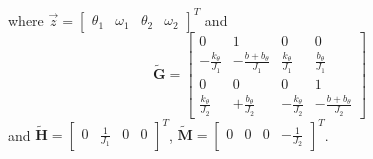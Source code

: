 \documentclass[11pt,a4paper,oneside]{book}
\numberwithin{equation}{section}
\theoremstyle{it}
\theoremstyle{definition}
\begin{document}
where $\vec{z}=\left[ \begin{matrix}
	\theta_1&\omega_1&\theta_2&\omega_2
\end{matrix}\right]^T$
and 
\begin{equation}
	\tilde{\mathbf{G}} = 
	\left[ \begin{matrix}
		0&1&0&0\\[6pt]
		-\frac{k_{\theta}}{J_1}&-\frac{b+b_{\theta}}{J_1}&\frac{k_{\theta}}{J_1}&\frac{b_{\theta}}{J_1}\\[6pt]
		0&0&0&1\\[6pt]
		\frac{k_{\theta}}{J_2}&+\frac{b_{\theta}}{J_2}&-\frac{k_{\theta}}{J_2}&-\frac{b+b_{\theta}}{J_2}
	\end{matrix}\right]
\end{equation}
and $\tilde{\mathbf{H}} =\left[ \begin{matrix}
	0&\frac{1}{J_1}&0&0
\end{matrix}\right]^T$, 
$\tilde{\mathbf{M}} =\left[ \begin{matrix}
	0&0&0&-\frac{1}{J_2}
\end{matrix}\right]^T$.
\end{document}
